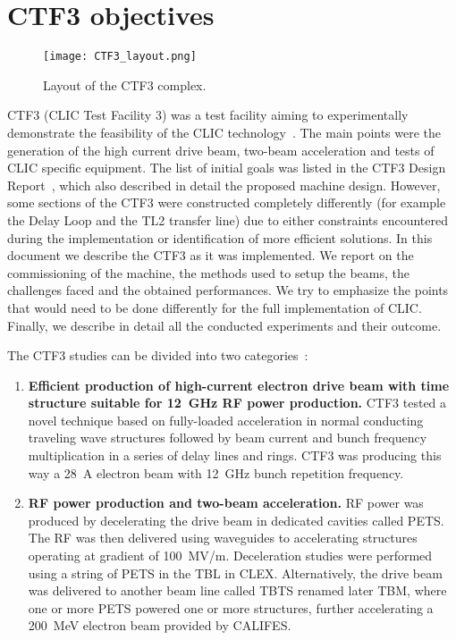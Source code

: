 \section{CTF3 objectives}

\begin{figure}[!h]
\begin{center}
\texttt{[image: CTF3\_layout.png]}
\end{center}
\caption{Layout of the CTF3 complex.}
\label{fig:ctf3layout}
\end{figure}

CTF3 (CLIC Test Facility 3) was a test facility aiming to experimentally demonstrate the feasibility 
of the CLIC technology~\cite{bib:CDR}.
The main points were the generation of the high current drive beam, 
two-beam acceleration and tests of CLIC specific equipment.
The list of initial goals was listed in the CTF3 Design Report~\cite{bib:CTF3DesignReport},
which also described in detail the proposed machine design. 
However, some sections of the CTF3 were constructed completely differently
(for example the Delay Loop and the TL2 transfer line)
due to either constraints encountered during the implementation or
identification of more efficient solutions.
In this document we describe the CTF3 as it was implemented.
We report on the commissioning of the machine, the methods used to setup the beams, 
the challenges faced and the obtained performances. 
We try to emphasize the points that would need to be done differently for the full implementation of CLIC. 
Finally, we describe in detail all the conducted experiments and their outcome.

The CTF3 studies can be divided into two categories~\cite{bib:CDR}:
\begin{enumerate}
\item  \textbf{Efficient production of high-current electron drive beam with time structure
suitable for 12~GHz RF power production.} CTF3 tested a novel technique based on 
fully-loaded acceleration in normal conducting traveling wave structures 
followed by beam current and bunch frequency multiplication in a series of delay lines and 
rings. CTF3 was producing this way a 28~A electron beam with 12~GHz bunch repetition
frequency. 

\item \textbf{RF power production and two-beam acceleration.} 
RF power was produced by decelerating the drive beam in dedicated cavities called PETS. The RF was then delivered using waveguides to 
accelerating structures operating at gradient of 100~MV/m.
Deceleration studies were performed using a string of PETS in the TBL in CLEX.
Alternatively, the drive beam was delivered to another beam line called 
TBTS renamed later TBM, 
where one or more PETS powered one or more structures, 
further accelerating a 200~MeV electron beam provided by CALIFES.

\end{enumerate}

